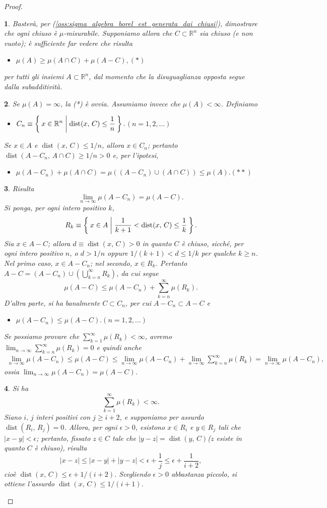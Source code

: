 \documentclass[a4paper,10pt,openright,oneside]{book}
\theoremstyle{theoremstyle}
\theoremstyle{theoremstylewoheader}
\theoremstyle{theoremstyle}
\theoremstyle{proofsecstyle}
\newtheorem{proofsec}{}
\theoremstyle{nonumberplain}
\newtheorem{proof}{Dim.}
\newcommand{\RR}{\ensuremath{\mathbb{R}}}
\newcommand{\abs}[1]{\ensuremath{\lvert #1 \rvert}}
\DeclareMathOperator{\dist}{dist}
\newcommand{\mymath}[2]{\begin{itemize}%
  \item[]\hfill\hbox{}\ensuremath{\displaystyle #1}\hfill\ensuremath{\displaystyle #2}%
  \end{itemize}}
\begin{document}
\begin{proof}
\begin{proofsec}
Basterà, per (\ref{oss:sigma_algebra_borel_est_generata_dai_chiusi}), dimostrare che ogni chiuso è $\mu$-misurabile. Supponiamo allora che $C \subset \RR^n$ sia chiuso (e non vuoto); è sufficiente far vedere che risulta \mymath{\mu(A) \ge \mu(A \cap C) + \mu(A - C),}{(*)} per tutti gli insiemi $A \subset \RR^n$, dal momento che la disuguaglianza opposta segue dalla subadditività.
\end{proofsec}

\begin{proofsec}
Se $\mu(A) = \infty$, la (*) è ovvia. Assumiamo invece che $\mu(A) < \infty$. Definiamo \mymath{C_n \equiv \Set { x \in \RR^n | \dist(x,\, C) \le \frac{1}{n} }.}{(n = 1, 2, \ldots)} Se $x \in A$ e $\dist(x,\, C) \le 1/n$, allora $x \in C_n$; pertanto $\dist(A - C_n,\, A \cap C) \ge 1/n > 0$ e, per l'ipotesi, \mymath{\mu(A - C_n) + \mu(A \cap C) = \mu((A - C_n) \cup (A \cap C)) \le \mu(A).}{(**)}
\end{proofsec}

\begin{proofsec}
\emph{Risulta}
\[
\lim_{n \to \infty} \mu(A - C_n) = \mu(A - C).
\]
Si ponga, per ogni intero positivo $k$,
\[
R_k \equiv \Set{ x \in A | \frac{1}{k+1} < \dist(x,\, C) \le \frac{1}{k} }.
\]
Sia $x \in A - C$; allora $d \equiv \dist(x,\, C) > 0$ in quanto $C$ è chiuso, sicché, per ogni intero positivo $n$, o $d > 1/n$ oppure $1/(k+1) < d \le 1/k$ per qualche $k \ge n$. Nel primo caso, $x \in A - C_n$; nel secondo, $x \in R_k$. Pertanto $A - C = (A - C_n) \cup \left(\bigcup_{k=n}^\infty R_k\right)$, da cui segue
\[
\mu(A - C) \le \mu(A - C_n) + \sum_{k=n}^\infty \mu(R_k).
\]
D'altra parte, si ha banalmente $C \subset C_n$, per cui $A - C_n \subset A - C$ e \mymath{\mu(A - C_n) \le \mu(A - C).}{(n = 1, 2, \ldots)} Se possiamo provare che $\sum_{k=1}^\infty \mu(R_k) < \infty$, avremo $\lim_{n \to \infty} \sum_{k=n}^\infty \mu(R_k) = 0$ e quindi anche
\begin{align*}
\lim_{n \to \infty} \mu(A - C_n) \le \mu(A - C)
\le \lim_{n \to \infty} \mu(A - C_n) + \lim_{n \to \infty} \sum_{k=n}^\infty \mu(R_k) = \lim_{n \to \infty} \mu(A - C_n),
\end{align*}
ossia $\lim_{n \to \infty} \mu(A - C_n) = \mu(A - C)$.
\end{proofsec}

\begin{proofsec}
\emph{Si ha}
\[
\sum_{k=1}^\infty \mu(R_k) < \infty.
\]
Siano $i,\, j$ interi positivi con $j \ge i+2$, e supponiamo per assurdo $\dist(R_i,\, R_j) = 0$. Allora, per ogni $\epsilon > 0$, esistono $x \in R_i$ e $y \in R_j$ tali che $\abs{x - y} < \epsilon$; pertanto, fissato $z \in C$ tale che $\abs{y - z} = \dist(y,\, C)$\linebreak ($z$ esiste in quanto $C$ è chiuso), risulta
\[
\abs{x - z} \le \abs{x - y} + \abs{y - z} < \epsilon + \frac{1}{j} \le \epsilon + \frac{1}{i+2},
\]
cioè $\dist(x,\, C) \le \epsilon + 1/(i+2)$. Scegliendo $\epsilon > 0$ abbastanza piccolo, si ottiene l'assurdo $\dist(x,\, C) \le 1/(i+1)$.


\end{proofsec}
\end{proof}
\end{document}

